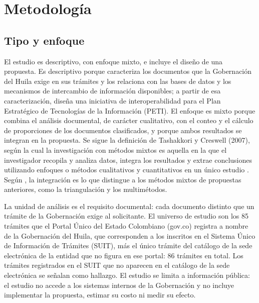 \section{Metodología}

\subsection{Tipo y enfoque}

El estudio es descriptivo, con enfoque mixto, e incluye el diseño de una propuesta. Es descriptivo porque caracteriza los documentos que la Gobernación del Huila exige en sus trámites y los relaciona con las bases de datos y los mecanismos de intercambio de información disponibles; a partir de esa caracterización, diseña una iniciativa de interoperabilidad para el Plan Estratégico de Tecnologías de la Información (PETI). El enfoque es mixto porque combina el análisis documental, de carácter cualitativo, con el conteo y el cálculo de proporciones de los documentos clasificados, y porque ambos resultados se integran en la propuesta. Se sigue la definición de Tashakkori y Creswell (2007), según la cual la investigación con métodos mixtos es aquella en la que el investigador recopila y analiza datos, integra los resultados y extrae conclusiones utilizando enfoques o métodos cualitativos y cuantitativos en un único estudio \parencite[como se citó en][Introducción, párr.~1]{cruzpetit2026metodos}. Según \textcite[Introducción, párr.~1]{cruzpetit2026metodos}, la integración es lo que distingue a los métodos mixtos de propuestas anteriores, como la triangulación y los multimétodos.

La unidad de análisis es el requisito documental: cada documento distinto que un trámite de la Gobernación exige al solicitante. El universo de estudio son los 85 trámites que el Portal Único del Estado Colombiano (gov.co) registra a nombre de la Gobernación del Huila, que corresponden a los inscritos en el Sistema Único de Información de Trámites (SUIT), más el único trámite del catálogo de la sede electrónica de la entidad que no figura en ese portal: 86 trámites en total. Los trámites registrados en el SUIT que no aparecen en el catálogo de la sede electrónica se señalan como hallazgo. El estudio se limita a información pública: el estudio no accede a los sistemas internos de la Gobernación y no incluye implementar la propuesta, estimar su costo ni medir su efecto.

